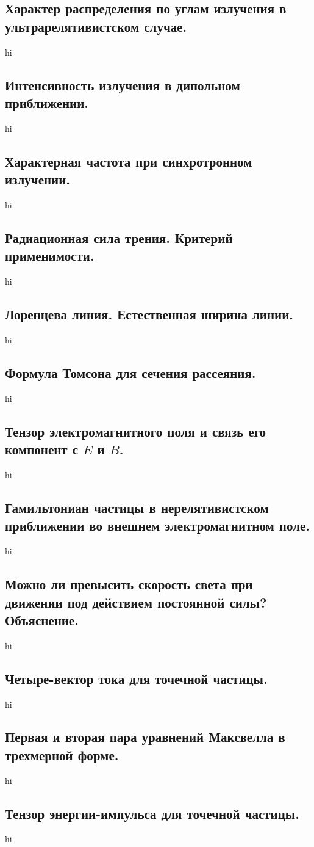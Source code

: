 \documentclass[a4paper,12pt]{article}
\begin{document}
\subsection{Характер распределения по углам излучения в ультрарелятивистском
случае.}
hi
\subsection{Интенсивность излучения в дипольном приближении.}
hi
\subsection{Характерная частота при синхротронном излучении.}
hi
\subsection{Радиационная сила трения. Критерий применимости.}
hi
\subsection{Лоренцева линия. Естественная ширина линии.}
hi
\subsection{Формула Томсона для сечения рассеяния.}
hi
\subsection{Тензор электромагнитного поля и связь его компонент с $E$ и $B$.}
hi
\subsection{Гамильтониан частицы в нерелятивистском приближении во внешнем
электромагнитном поле.}
hi
\subsection{Можно ли превысить скорость света при движении под действием
постоянной силы? Объяснение.}
hi
\subsection{Четыре-вектор тока для точечной частицы.}
hi
\subsection{Первая и вторая пара уравнений Максвелла в трехмерной форме.}
hi
\subsection{Тензор энергии-импульса для точечной частицы.}
hi
\end{document}
